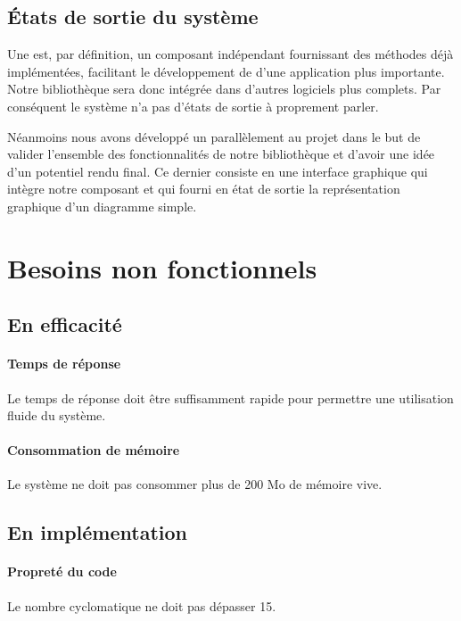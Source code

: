 \documentclass[12pt,a4paper,openany]{report}
\begin{document}
	\subsection{États de sortie du système}
	Une  
	est, par définition, un composant indépendant fournissant des méthodes déjà implémentées, facilitant le développement de d'une application plus importante. 
	Notre bibliothèque sera donc intégrée dans d'autres logiciels plus complets.  Par conséquent le système n'a pas d'états de sortie à proprement parler.

	Néanmoins nous avons développé un 
	parallèlement au projet dans le but de valider l'ensemble
	des fonctionnalités de notre bibliothèque et d'avoir une idée d'un potentiel rendu final.
	Ce dernier consiste en une interface graphique qui intègre notre composant et qui fourni en 
	état de sortie la représentation graphique d'un diagramme simple.

	\section{Besoins non fonctionnels}
	\subsection{En efficacité}
			\paragraph{Temps de réponse} Le temps de réponse doit être suffisamment rapide pour permettre une utilisation fluide du système.
			\paragraph{Consommation de mémoire} Le système ne doit pas consommer plus de 200 Mo de mémoire vive.
		\subsection{En implémentation}
			\paragraph{Propreté du code} Le nombre cyclomatique ne doit pas dépasser 15.
\end{document}
